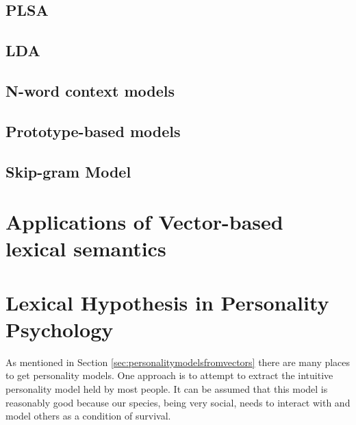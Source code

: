 \documentclass[eric_thesis.tex]{subfiles}
\begin{document}
\subsection{PLSA}

\subsection{LDA}

\subsection{N-word context models}

\subsection{Prototype-based models}

\subsection{Skip-gram Model}

\section{Applications of Vector-based lexical semantics}


\section{Lexical Hypothesis in Personality Psychology}

As mentioned in Section \ref{sec:personalitymodelsfromvectors} there are many
places to get personality models. One approach is to attempt to extract the 
intuitive personality model held by most people. It can be assumed that this
model is reasonably good because our species, being very social, needs to 
interact with and model others as a condition of survival. 
\end{document}
